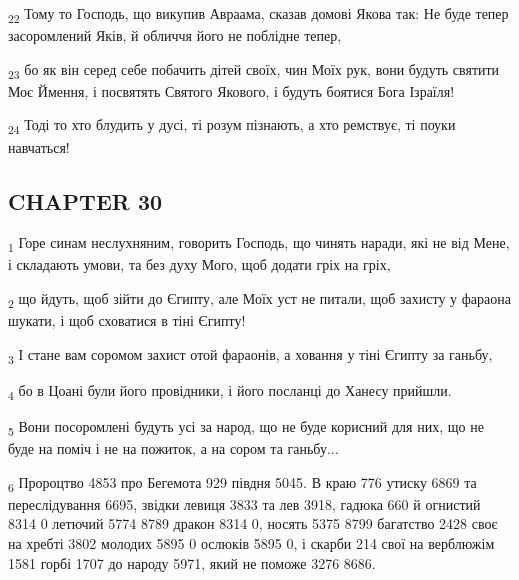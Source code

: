 \begin{tcolorbox}
\textsubscript{22} Тому то Господь, що викупив Авраама, сказав домові Якова так: Не буде тепер засоромлений Яків, й обличчя його не поблідне тепер,
\end{tcolorbox}
\begin{tcolorbox}
\textsubscript{23} бо як він серед себе побачить дітей своїх, чин Моїх рук, вони будуть святити Моє Ймення, і посвятять Святого Якового, і будуть боятися Бога Ізраїля!
\end{tcolorbox}
\begin{tcolorbox}
\textsubscript{24} Тоді то хто блудить у дусі, ті розум пізнають, а хто ремствує, ті поуки навчаться!
\end{tcolorbox}
\subsection{CHAPTER 30}
\begin{tcolorbox}
\textsubscript{1} Горе синам неслухняним, говорить Господь, що чинять наради, які не від Мене, і складають умови, та без духу Мого, щоб додати гріх на гріх,
\end{tcolorbox}
\begin{tcolorbox}
\textsubscript{2} що йдуть, щоб зійти до Єгипту, але Моїх уст не питали, щоб захисту у фараона шукати, і щоб сховатися в тіні Єгипту!
\end{tcolorbox}
\begin{tcolorbox}
\textsubscript{3} І стане вам соромом захист отой фараонів, а ховання у тіні Єгипту за ганьбу,
\end{tcolorbox}
\begin{tcolorbox}
\textsubscript{4} бо в Цоані були його провідники, і його посланці до Ханесу прийшли.
\end{tcolorbox}
\begin{tcolorbox}
\textsubscript{5} Вони посоромлені будуть усі за народ, що не буде корисний для них, що не буде на поміч і не на пожиток, а на сором та ганьбу...
\end{tcolorbox}
\begin{tcolorbox}
\textsubscript{6} Пророцтво 4853 про Бегемота 929 півдня 5045. В краю 776 утиску 6869 та переслідування 6695, звідки левиця 3833 та лев 3918, гадюка 660 й огнистий 8314 0 летючий 5774 8789 дракон 8314 0, носять 5375 8799 багатство 2428 своє на хребті 3802 молодих 5895 0 ослюків 5895 0, і скарби 214 свої на верблюжім 1581 горбі 1707 до народу 5971, який не поможе 3276 8686.
\end{tcolorbox}
